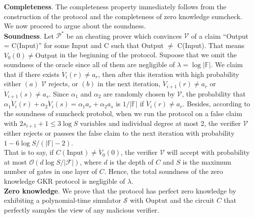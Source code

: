 \noindent
\textbf{Completeness}. The completeness property immediately follows from the construction of the protocol and the completeness of zero knowledge sumcheck. We now proceed to argue about the soundness.\\

\noindent
\textbf{Soundness}. Let $\mathcal{P}^*$ be an cheating prover which convinces $\mathcal{V}$ of a claim ``Output = C(Input)'' for some Input and C such that Output $\neq$ C(Input). That means $\dot{V_0(0)} \neq \text{Output}$ in the beginning of the protocol. Supoose that we omit the soundness of the oracle since all of them are negligible of $\lambda = \log |\mathbb{F}|$. We claim that if there exists $\dot{V}_i(r) \neq a_r$, then after this iteration with high probability either $(a)$ $\mathcal{V}$ rejects, or $(b)$ in the next iteration, $\dot{V}_{i+1}(r) \neq a_r$ or $\dot{V}_{i+1}(s) \neq a_s$. Since $\alpha_1$ and $\alpha_2$ are randomly chosen by $\mathcal{V}$, the probability that $\alpha_1 \dot{V}_i(r) + \alpha_2 \dot{V}_i(s) = \alpha_1 a_{r} + \alpha_2 a_{s}$ is $1/|\mathbb{F}|$ if $\dot{V}_i(r) \neq a_r$. Besides, according to the soundness of sumcheck protobol, when we run the protocol on a false claim with $2s_{i+1} + 1 \leq 3 \log S$ variables and individual degree at most 2, the verifier $\mathcal{V}$ either rejects or passses the false claim to the next iteration with probability $1 - 6 \log S / (|\mathbb{F}| - 2)$.\\

That is to say, if $C(\text{Input}) \neq \dot{V}_0(0)$, the verifier $\mathcal{V}$ will accept with probability at most $\mathcal{O}(d \log S / |\mathcal{F}|)$, where $d$ is the depth of $C$ and $S$ is the maximum number of gates in one layer of $C$. Hence, the total soundness of the zero knowledge GKR protocol is negligible of $\lambda$.\\

\noindent
\textbf{Zero knowledge}. We prove that the protocol has perfect zero knowledge by exhibiting a polynomial-time simulator $\mathcal{S}$ with $\text{Ouptut}$ and the circuit $C$ that perfectly samples the view of any malicious verifier. 


